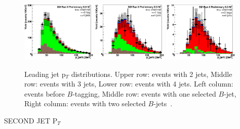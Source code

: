 \begin{figure}[!h!tbp]
\begin{center}
\includegraphics[width=0.32\textwidth]{eps/DataBackground/EMU/emu_EqZeroTag_EqFourJet_Jet1Pt.eps}
\includegraphics[width=0.32\textwidth]{eps/DataBackground/EMU/emu_EqOneTag_EqFourJet_Jet1Pt.eps}
\includegraphics[width=0.32\textwidth]{eps/DataBackground/EMU/emu_EqTwoTag_EqFourJet_Jet1Pt.eps}
\end{center}
\vspace{-0.1in}
\caption{Leading jet p$_{T}$ distributions. Upper row: events with 2 jets, Middle row: events with 3 jets, Lower row: events with 4 jets. Left column: events before $B$-tagging, Middle row: events with one selected $B$-jet, Right column: events with two selected $B$-jets~\cite{singletopnote}.}
\label{Jet1pt}
\end{figure}



\clearpage
\begin{center}
SECOND JET P$_{T}$
\end{center}

